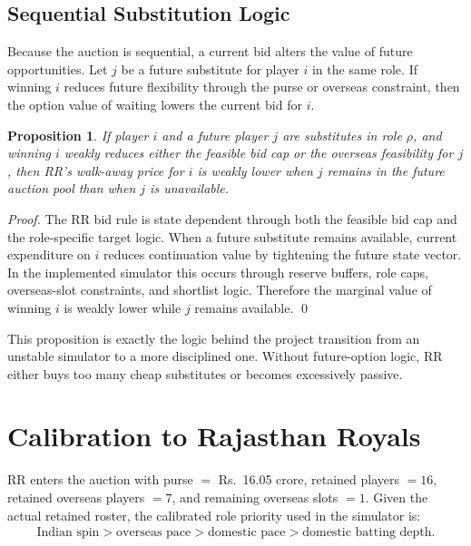 \documentclass[11pt]{article}
\newtheorem{proposition}{Proposition}
\begin{document}
\subsection{Sequential Substitution Logic}

Because the auction is sequential, a current bid alters the value of future opportunities. Let \(j\) be a future substitute for player \(i\) in the same role. If winning \(i\) reduces future flexibility through the purse or overseas constraint, then the option value of waiting lowers the current bid for \(i\).

\begin{proposition}
If player \(i\) and a future player \(j\) are substitutes in role \(\rho\), and winning \(i\) weakly reduces either the feasible bid cap or the overseas feasibility for \(j\), then RR's walk-away price for \(i\) is weakly lower when \(j\) remains in the future auction pool than when \(j\) is unavailable.
\end{proposition}

\begin{proof}
The RR bid rule is state dependent through both the feasible bid cap and the role-specific target logic. When a future substitute remains available, current expenditure on \(i\) reduces continuation value by tightening the future state vector. In the implemented simulator this occurs through reserve buffers, role caps, overseas-slot constraints, and shortlist logic. Therefore the marginal value of winning \(i\) is weakly lower while \(j\) remains available. \qed
\end{proof}

This proposition is exactly the logic behind the project transition from an unstable simulator to a more disciplined one. Without future-option logic, RR either buys too many cheap substitutes or becomes excessively passive.

\section{Calibration to Rajasthan Royals}

RR enters the auction with purse \(=\) Rs.\ 16.05 crore, retained players \(=16\), retained overseas players \(=7\), and remaining overseas slots \(=1\). Given the actual retained roster, the calibrated role priority used in the simulator is:
\begin{align}
\text{Indian spin} > \text{overseas pace} > \text{domestic pace} > \text{domestic batting depth}.
\end{align}
\end{document}
